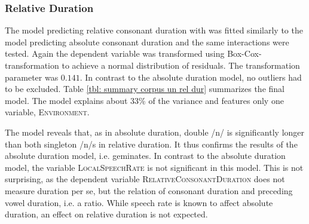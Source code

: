 \subsubsection{Relative Duration}


The model predicting relative consonant duration with  was fitted similarly to the model predicting absolute consonant duration and the same interactions were tested. Again the dependent variable was transformed using Box-Cox- transformation to achieve a normal distribution of residuals. The transformation parameter was $0.141$. In contrast to the absolute duration model, no outliers had to be excluded. 
 Table \ref{tbl: summary corpus un rel dur} summarizes the final model. The model explains about 33\% of the variance and features only one variable, \textsc{Environment}.



\begin{table}[h!]
	\caption{ Summary of linear model for variables predicting the Box-Cox-transformed relative duration of [n] in prefixed words}
	\label{tbl: summary corpus un rel dur}
	\begin{center}
		
	\end{center}
\end{table}



The model reveals that, as in absolute duration, double /n/ is significantly longer than both singleton /n/s in relative duration. It thus confirms the results of the absolute duration model, i.e.  geminates. In contrast to the absolute duration model, the variable \textsc{LocalSpeechRate} is not significant in this model. This is not surprising, as the dependent variable \textsc{RelativeConsonantDuration} does not measure duration per se, but the relation of consonant duration and preceding vowel duration, i.e. a ratio. While speech rate is known to affect absolute duration, an effect on relative duration is not expected. 

